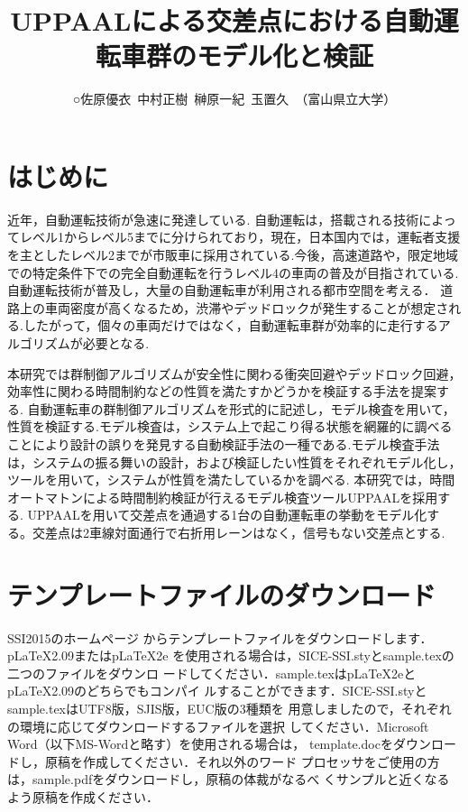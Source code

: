 \documentclass{jarticle}
\begin{document}
\title{UPPAALによる交差点における自動運転車群のモデル化と検証}
\author{○佐原優衣\ 中村正樹\ 榊原一紀\ 玉置久\ （富山県立大学）}



\maketitle\thispagestyle{empty}
\pagestyle{empty}

\section{はじめに}
近年，自動運転技術が急速に発達している. 自動運転は，搭載される技術によってレベル1からレベル5までに分けられており，現在，日本国内では，運転者支援を主としたレベル2までが市販車に採用されている.今後，高速道路や，限定地域での特定条件下での完全自動運転を行うレベル4の車両の普及が目指されている.
自動運転技術が普及し，大量の自動運転車が利用される都市空間を考える．
道路上の車両密度が高くなるため，渋滞やデッドロックが発生することが想定される.したがって，個々の車両だけではなく，自動運転車群が効率的に走行するアルゴリズムが必要となる.
	
本研究では群制御アルゴリズムが安全性に関わる衝突回避やデッドロック回避，効率性に関わる時間制約などの性質を満たすかどうかを検証する手法を提案する.
自動運転車の群制御アルゴリズムを形式的に記述し，モデル検査を用いて，性質を検証する.モデル検査は，システム上で起こり得る状態を網羅的に調べることにより設計の誤りを発見する自動検証手法の一種である.モデル検査手法は，システムの振る舞いの設計，および検証したい性質をそれぞれモデル化し，ツールを用いて，システムが性質を満たしているかを調べる.
本研究では，時間オートマトン\cite{u3}による時間制約検証が行えるモデル検査ツールUPPAAL\cite{u1,u2}を採用する.
UPPAALを用いて交差点を通過する1台の自動運転車の挙動をモデル化する。交差点は2車線対面通行で右折用レーンはなく，信号もない交差点とする.

\section{テンプレートファイルのダウンロード}

SSI2015のホームページ\cite{大会ホームページ}
からテンプレートファイルをダウンロードします．pLaTeX2.09またはpLaTeX2e
を使用される場合は，SICE-SSI.styとsample.texの二つのファイルをダウンロ
ードしてください．sample.texはpLaTeX2eとpLaTeX2.09のどちらでもコンパイ
ルすることができます．SICE-SSI.styとsample.texはUTF8版，SJIS版，EUC版の3種類を
用意しましたので，それぞれの環境に応じてダウンロードするファイルを選択
してください．Microsoft Word（以下MS-Wordと略す）を使用される場合は，
template.docをダウンロードし，原稿を作成してください．それ以外のワード
プロセッサをご使用の方は，sample.pdfをダウンロードし，原稿の体裁がなるべ
くサンプルと近くなるよう原稿を作成ください．
\end{document}
